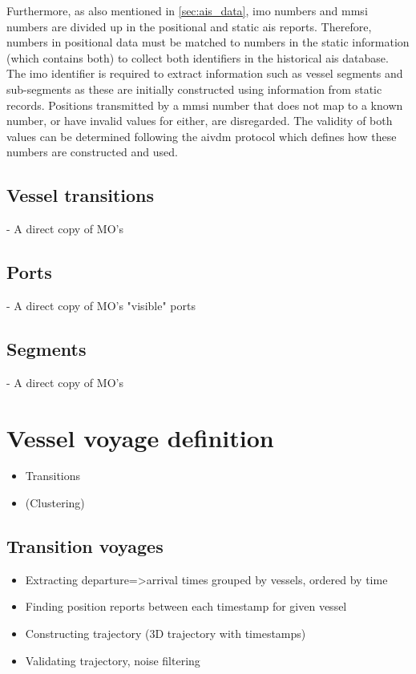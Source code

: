 Furthermore, as also mentioned in \cref{sec:ais_data}, \acrshort{imo} numbers and \acrshort{mmsi} numbers are divided up in the positional and static \acrshort{ais} reports. Therefore,  numbers in positional data must be matched to  numbers in the static information (which contains both) to collect both identifiers in the historical \acrshort{ais} database. The \acrshort{imo} identifier is required to extract information such as vessel segments and sub-segments as these are initially constructed using information from static records. Positions transmitted by a \acrshort{mmsi} number that does not map to a known  number, or have invalid values for either, are disregarded. The validity of both values can be determined following the \gls{aivdm} protocol which defines how these numbers are constructed and used.


\subsection{Vessel transitions}

 - A direct copy of MO's

\subsection{Ports}

 - A direct copy of MO's "visible" ports

\subsection{Segments}

 - A direct copy of MO's


\section{Vessel voyage definition}

\begin{itemize}
    \item Transitions
    \item (Clustering)
\end{itemize}


\subsection{Transition voyages}

\begin{itemize}
    \item Extracting departure=>arrival times grouped by vessels, ordered by time
    \item Finding position reports between each timestamp for given vessel
    \item Constructing trajectory (3D trajectory with timestamps)
    \item Validating trajectory, noise filtering
\end{itemize}

